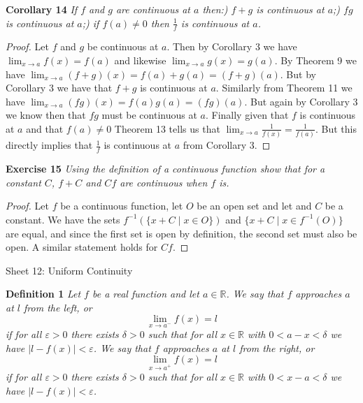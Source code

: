 \documentclass{article}
\begin{document}
\begin{flushleft}
\textbf{Corollary 14}
\textsl{If $f$ and $g$ are continuous at $a$ then:) $f+g$ is continuous at $a$;) $fg$ is continuous at $a$;) if $f(a) \neq 0$ then $\frac{1}{f}$ is continuous at $a$.}
\begin{proof}
Let $f$ and $g$ be continuous at $a$. Then by Corollary 3 we have $\lim_{x \rightarrow a} f(x) = f(a)$ and likewise $\lim_{x \rightarrow a} g(x) = g(a)$. By Theorem 9 we have $\lim_{x \rightarrow a} (f+g)(x)=f(a)+g(a)=(f+g)(a)$. But by Corollary 3 we have that $f+g$ is continuous at $a$. Similarly from Theorem 11 we have $\lim_{x \rightarrow a} (fg)(x) = f(a)g(a)=(fg)(a)$. But again by Corollary 3 we know then that $fg$ must be continuous at $a$. Finally given that $f$ is continuous at $a$ and that $f(a) \neq 0$ Theorem 13 tells us that $\lim_{x \rightarrow a} \frac{1}{f(x)} = \frac{1}{f(a)}$. But this directly implies that $\frac{1}{f}$ is continuous at $a$ from Corollary 3.
\end{proof}

\textbf{Exercise 15}
\textsl{Using the definition of a continuous function show that for a constant $C$, $f+C$ and $Cf$ are continuous when $f$ is.}
\begin{proof}
Let $f$ be a continuous function, let $O$ be an open set and let and $C$ be a constant. We have the sets $f^{-1}(\{x + C \mid x \in O\})$ and $\{x + C \mid x \in f^{-1}(O)\}$ are equal, and since the first set is open by definition, the second set must also be open. A similar statement holds for $Cf$.
\end{proof}

\newpage

\Large

Sheet 12: Uniform Continuity\newline

\normalsize

\textbf{Definition 1}
\textsl{Let $f$ be a real function and let $a \in \mathbb{R}$. We say that $f$ approaches $a$ at $l$ from the left, or
\[
\lim_{x \rightarrow a^-} f(x) = l
\]
if for all $\varepsilon > 0$ there exists $\delta > 0$ such that for all $x \in \mathbb{R}$ with $0 < a - x < \delta$ we have $|l - f(x)| < \varepsilon$. We say that $f$ approaches $a$ at $l$ from the right, or
\[
\lim_{x \rightarrow a^+} f(x) = l
\]
if for all $\varepsilon > 0$ there exists $\delta > 0$ such that for all $x \in \mathbb{R}$ with $0 < x - a < \delta$ we have $|l - f(x)| < \varepsilon$.}\newline


\end{flushleft}
\end{document}
